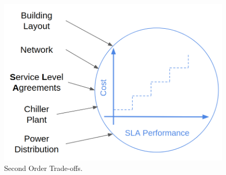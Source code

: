 \begin{figure} [!h]
\centering
\includegraphics[scale=.25]{methodology/images/bcu_second_order.png}
\caption[Bottom Cooled Unit Second Order Trade-Offs]{Second Order Trade-offs.}
\label{img_bcu_second_order}
\end{figure}